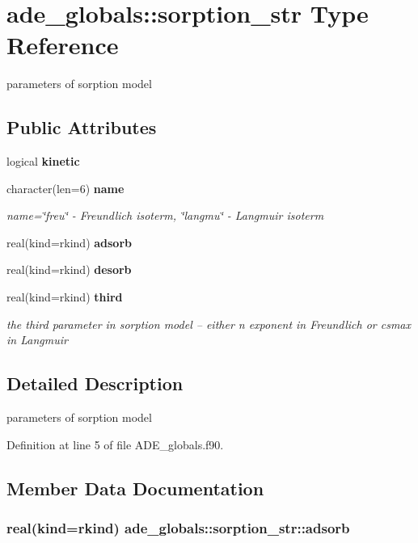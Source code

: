 \section{ade\+\_\+globals\+:\+:sorption\+\_\+str Type Reference}
\label{structade__globals_1_1sorption__str}


parameters of sorption model  


\subsection*{Public Attributes}
\begin{DoxyCompactItemize}
\item 
logical {\bf kinetic}
\item 
character(len=6) {\bf name}
\begin{DoxyCompactList}\small\item\em name=\char`\"{}freu\char`\"{} -\/ Freundlich isoterm, \char`\"{}langmu\char`\"{} -\/ Langmuir isoterm \end{DoxyCompactList}\item 
real(kind=rkind) {\bf adsorb}
\item 
real(kind=rkind) {\bf desorb}
\item 
real(kind=rkind) {\bf third}
\begin{DoxyCompactList}\small\item\em the third parameter in sorption model -- either n exponent in Freundlich or csmax in Langmuir \end{DoxyCompactList}\end{DoxyCompactItemize}


\subsection{Detailed Description}
parameters of sorption model 

Definition at line 5 of file A\+D\+E\+\_\+globals.\+f90.



\subsection{Member Data Documentation}
\subsubsection[{adsorb}]{\setlength{\rightskip}{0pt plus 5cm}real(kind=rkind) ade\+\_\+globals\+::sorption\+\_\+str\+::adsorb}\label{structade__globals_1_1sorption__str_a0510c4b6c5fa60f454b8eed73b1bbf08}


